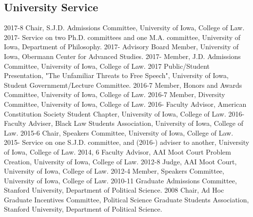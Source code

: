 \documentclass[letterpaper]{moderncv}
\begin{document}
\subsection{University Service}
\cvitem
{2017-8}
{Chair, S.J.D. Admissions Committee, University of Iowa, College of Law.}
\vspace{1mm}
\cvitem
{2017-}
{Service on two Ph.D. committees and one M.A. committee, University of Iowa, Department of Philosophy.}
\vspace{1mm}
\cvitem
{2017-}
{Advisory Board Member, University of Iowa, Obermann Center for Advanced Studies.}
\vspace{1mm}
\cvitem
{2017-}
{Member, J.D. Admissions Committee, University of Iowa, College of Law.}
\vspace{1mm}
\cvitem
{2017}
{Public/Student Presentation, "The Unfamiliar Threats to Free Speech", University of Iowa, Student Governmemt/Lecture Committee.}
\vspace{1mm}
\cvitem
{2016-7}
{Member, Honors and Awards Committee, University of Iowa, College of Law.}
\vspace{1mm}
\cvitem
{2016-7}
{Member, Diversity Committee, University of Iowa, College of Law.}
\vspace{1mm}
\cvitem
{2016-}
{Faculty Advisor, American Constitution Society Student Chapter, University of Iowa, College of Law.}
\vspace{1mm}
\cvitem
{2016-}
{Faculty Adviser, Black Law Students Association, University of Iowa, College of Law.}
\vspace{1mm}
\cvitem
{2015-6}
{Chair, Speakers Committee, University of Iowa, College of Law.}
\vspace{1mm}
\cvitem
{2015-}
{Service on one S.J.D. committee, and (2016-) adviser to another, University of Iowa, College of Law.}
\vspace{1mm}
\cvitem
{2014, 6}
{Faculty Advisor, AAI Moot Court Problem Creation, University of Iowa, College of Law.}
\vspace{1mm}
\cvitem
{2012-8}
{Judge, AAI Moot Court, University of Iowa, College of Law.}
\vspace{1mm}
\cvitem
{2012-4}
{Member, Speakers Committee, University of Iowa, College of Law.}
\vspace{1mm}
\cvitem
{2010-11}
{Graduate Admissions Committee, Stanford University, Department of Political Science.}
\vspace{1mm}
\cvitem
{2008}
{Chair, Ad Hoc Graduate Incentives Committee, Political Science Graduate Students Association, Stanford University, Department of Political Science.}
\end{document}
